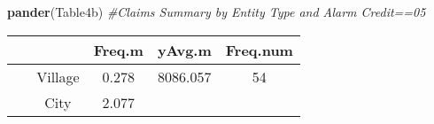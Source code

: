 \documentclass[]{book}
\newenvironment{Shaded}{\begin{snugshade}}{\end{snugshade}}
\newcommand{\KeywordTok}[1]{\textcolor[rgb]{0.13,0.29,0.53}{\textbf{#1}}}
\newcommand{\CommentTok}[1]{\textcolor[rgb]{0.56,0.35,0.01}{\textit{#1}}}
\newcommand{\NormalTok}[1]{#1}
\theoremstyle{definition}
\theoremstyle{definition}
\theoremstyle{definition}
\theoremstyle{remark}
\begin{document}
\begin{Shaded}
\begin{Highlighting}[]
\KeywordTok{pander}\NormalTok{(Table4b) }\CommentTok{#Claims Summary by Entity Type and Alarm Credit==05 }
\end{Highlighting}
\end{Shaded}

\begin{longtable}[]{@{}ccccc@{}}
\toprule
\begin{minipage}[b]{0.11\columnwidth}\centering\strut
~\strut
\end{minipage} & \begin{minipage}[b]{0.12\columnwidth}\centering\strut
~\strut
\end{minipage} & \begin{minipage}[b]{0.11\columnwidth}\centering\strut
Freq.m\strut
\end{minipage} & \begin{minipage}[b]{0.14\columnwidth}\centering\strut
yAvg.m\strut
\end{minipage} & \begin{minipage}[b]{0.14\columnwidth}\centering\strut
Freq.num\strut
\end{minipage}\tabularnewline
\midrule
\endhead
\begin{minipage}[t]{0.11\columnwidth}\centering\strut
\strut
\end{minipage} & \begin{minipage}[t]{0.12\columnwidth}\centering\strut
Village\strut
\end{minipage} & \begin{minipage}[t]{0.11\columnwidth}\centering\strut
0.278\strut
\end{minipage} & \begin{minipage}[t]{0.14\columnwidth}\centering\strut
8086.057\strut
\end{minipage} & \begin{minipage}[t]{0.14\columnwidth}\centering\strut
54\strut
\end{minipage}\tabularnewline
\begin{minipage}[t]{0.11\columnwidth}\centering\strut
\strut
\end{minipage} & \begin{minipage}[t]{0.12\columnwidth}\centering\strut
City\strut
\end{minipage} & \begin{minipage}[t]{0.11\columnwidth}\centering\strut
2.077\strut
\end{minipage} & \begin{minipage}[t]{0.14\columnwidth}\centering\strut

\end{minipage}
\end{longtable}
\end{document}
